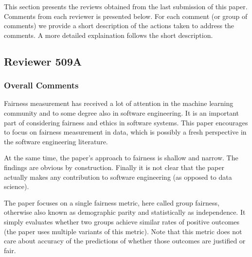 \documentclass[conference,review,anonymous]{IEEEtran}
\begin{document}
This section presents the reviews obtained from the last submission of this paper. Comments from each reviewer is presented below. For each comment (or group of comments) we provide a short description of the actions taken to address the comments. A more detailed explaination follows the short description.

\subsection{Reviewer 509A}
\subsubsection{Overall Comments}

Fairness measurement has received a lot of attention in the machine
learning community and to some degree also in software engineering. It
is an important part of considering fairness and ethics in software
systems. This paper encourages to focus on fairness measurement in
data, which is possibly a fresh perspective in the software
engineering literature.

At the same time, the paper’s approach to fairness is shallow and
narrow. The findings are obvious by construction. Finally it is not
clear that the paper actually makes any contribution to software
engineering (as opposed to data science).

The paper focuses on a single fairness metric, here called group
fairness, otherwise also known as demographic parity and statistically
as independence. It simply evaluates whether two groups achieve
similar rates of positive outcomes (the paper uses multiple variants
of this metric). Note that this metric does not care about accuracy of
the predictions of whether those outcomes are justified or fair.
\end{document}
